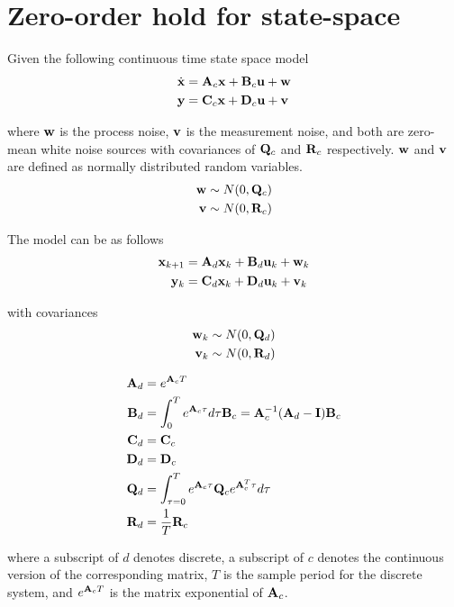 \section{Zero-order hold for state-space}

Given the following continuous time state space model
\begin{align*}
  \dot{\mathbf{x}} &= \mathbf{A}_c\mathbf{x} + \mathbf{B}_c\mathbf{u} + \mathbf{w} \\
  \mathbf{y} &= \mathbf{C}_c\mathbf{x} + \mathbf{D}_c\mathbf{u} + \mathbf{v}
\end{align*}

where $\mathbf{w}$ is the process noise, $\mathbf{v}$ is the measurement noise, and
both are zero-mean white noise sources with covariances of $\mathbf{Q}_c$ and
$\mathbf{R}_c$ respectively. $\mathbf{w}$ and $\mathbf{v}$ are defined as normally
distributed random variables.
\begin{align*}
  \mathbf{w} &\sim N(0, \mathbf{Q}_c) \\
  \mathbf{v} &\sim N(0, \mathbf{R}_c)
\end{align*}

The model can be  as follows
\begin{align*}
  \mathbf{x}_{k+1} &= \mathbf{A}_d \mathbf{x}_k + \mathbf{B}_d \mathbf{u}_k + \mathbf{w}_k \\
   \mathbf{y}_k &= \mathbf{C}_d \mathbf{x}_k + \mathbf{D}_d \mathbf{u}_k + \mathbf{v}_k
\end{align*}

with covariances
\begin{align*}
  \mathbf{w}_k &\sim N(0, \mathbf{Q}_d) \\
  \mathbf{v}_k &\sim N(0, \mathbf{R}_d)
\end{align*}
\begin{theorem}
  \label{thm:zoh_ss}

  \begin{align}
    \mathbf{A}_d &= e^{\mathbf{A}_c T} \\
    \mathbf{B}_d &= \int_0^T e^{\mathbf{A}_c \tau} d\tau \mathbf{B}_c =
      \mathbf{A}_c^{-1} (\mathbf{A}_d - \mathbf{I}) \mathbf{B}_c \\
    \mathbf{C}_d &= \mathbf{C}_c \\
    \mathbf{D}_d &= \mathbf{D}_c \\
    \mathbf{Q}_d &= \int_{\tau = 0}^{T} e^{\mathbf{A}_c\tau} \mathbf{Q}_c
      e^{\mathbf{A}_c^T\tau} d\tau \\
    \mathbf{R}_d &= \frac{1}{T}\mathbf{R}_c
  \end{align}

  where a subscript of $d$ denotes discrete, a subscript of $c$ denotes the
  continuous version of the corresponding matrix, $T$ is the sample period for
  the discrete \gls{system}, and $e^{\mathbf{A}_c T}$ is the matrix exponential of
  $\mathbf{A}_c$.
\end{theorem}

